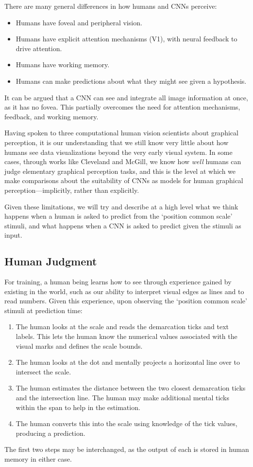 \documentclass[journal]{vgtc}        %
\newcommand{\change}[1]{{#1}}
\begin{document}
\change{
There are many general differences in how humans and CNNs perceive: 
\begin{itemize}[itemsep=0.5pt, topsep=1pt, parsep=0.5pt]
    \item Humans have foveal and peripheral vision. 
    \item Humans have explicit attention mechanisms (V1), with neural feedback to drive attention.
    \item Humans have working memory.
    \item Humans can make predictions about what they might see given a hypothesis. 
\end{itemize}    
It can be argued that a CNN can see and integrate all image information at once, as it has no fovea. This partially overcomes the need for attention mechanisms, feedback, and working memory. 

Having spoken to three computational human vision scientists about graphical perception, it is our understanding that we still know very little about how humans see data visualizations beyond the very early visual system. In some cases, through works like Cleveland and McGill, we know how \emph{well} humans can judge elementary graphical perception tasks, and this is the level at which we make comparisons about the suitability of CNNs as models for human graphical perception---implicitly, rather than explicitly.

Given these limitations, we will try and describe at a high level what we think happens when a human is asked to predict from the `position common scale' stimuli, and what happens when a CNN is asked to predict given the stimuli as input.

\subsection{Human Judgment}
For training, a human being learns how to see through experience gained by existing in the world, such as our ability to interpret visual edges as lines and to read numbers. Given this experience, upon observing the `position common scale' stimuli at prediction time:
\begin{enumerate}[label=\arabic*.,itemsep=0.5pt, topsep=1pt, parsep=0.5pt]
    \item The human looks at the scale and reads the demarcation ticks and text labels. This lets the human know the numerical values associated with the visual marks and defines the scale bounds.
    \item The human looks at the dot and mentally projects a horizontal line over to intersect the scale.
    \item The human estimates the distance between the two closest demarcation ticks and the intersection line. The human may make additional mental ticks within the span to help in the estimation.
    \item The human converts this into the scale using knowledge of the tick values, producing a prediction.
\end{enumerate}
The first two steps may be interchanged, as the output of each is stored in human memory in either case.


}
\end{document}
